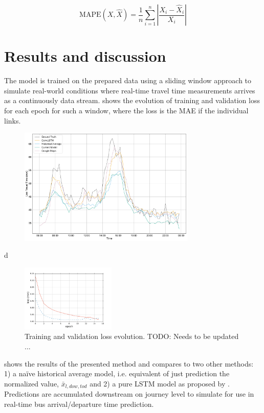 \documentclass[preprint,11pt,5p,twocolumn]{elsarticle}
\begin{document}
\begin{equation}
    \textrm{MAPE}(X, \widehat{X}) = \frac{1}{n} \sum_{i = 1}^{n} \left| \frac{X_i - \widehat{X}_i}{X_i} \right| 
    \label{eq:mape} 
\end{equation}

\section{Results and discussion}
\label{sec:results}
The model is trained on the prepared data using a sliding window approach to simulate real-world conditions where real-time travel time measurements arrives as a continuously data stream.  shows the evolution of training and validation loss for each epoch for such a window, where the loss is the MAE if the individual links.

\begin{figure}[!ht]
  \centering
  \includegraphics[width=0.75\textwidth]{plots/comparison_day.pdf}
  \caption{}
  \label{fig:comparison_day}
\end{figure}

d
\begin{figure}[!ht]
  \centering
  \includegraphics[width=0.4\textwidth]{plots/conv_lstm_model_loss.pdf}
  \caption{Training and validation loss evolution. TODO: Needs to be updated ...}
  \label{fig:loss}
\end{figure}

 shows the results of the presented method and compares to two other methods: 1) a naïve historical average model, i.e. equivalent of just prediction the normalized value, $\bar{x}_{l,\mathit{dow},\mathit{tod}}$ and 2) a pure LSTM model as proposed by \cite{YanjieDuan2016}. Predictions are accumulated downstream on journey level to simulate for use in real-time bus arrival/departure time prediction.
\end{document}
